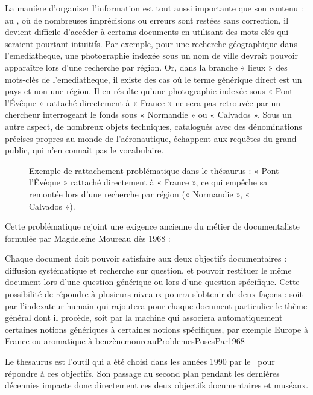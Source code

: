 La manière d’organiser l’information est tout aussi importante que son contenu : au \mae, où de nombreuses imprécisions ou erreurs sont restées sans correction, il devient difficile d’accéder à certains documents en utilisant des mots-clés qui seraient pourtant intuitifs. Par exemple, pour une recherche géographique dans l’\gls{emediatheque}, une photographie indexée sous un nom de ville devrait pouvoir apparaître lors d’une recherche par région. Or, dans la branche « lieux » des mots-clés de l’\gls{emediatheque}, il existe des cas où le terme générique direct est un pays et non une région. Il en résulte qu’une photographie indexée sous « Pont-l’Évêque » rattaché directement à « France » ne sera pas retrouvée par un chercheur interrogeant le fonds sous « Normandie » ou « Calvados ». Sous un autre aspect, de nombreux objets techniques, catalogués avec des dénominations précises propres au monde de l’aéronautique, échappent aux requêtes du grand public, qui n’en connaît pas le vocabulaire.

\begin{figure}[htbp]
	
	\caption{Exemple de rattachement problématique dans le thésaurus : « Pont-l’Évêque » rattaché directement à « France », ce qui empêche sa remontée lors d'une recherche par région (« Normandie », « Calvados »).}
	\label{fig:thesaurus_geo_pb}
\end{figure}


Cette problématique rejoint une exigence ancienne du métier de documentaliste formulée par Magdeleine Moureau dès 1968 :

\begin{myquote}
	{Chaque document doit pouvoir satisfaire aux deux objectifs documentaires : diffusion systématique et recherche sur question, et pouvoir restituer le même document lors d’une question générique ou lors d’une question spécifique. Cette possibilité de répondre à plusieurs niveaux pourra s’obtenir de deux façons : soit par l’indexateur humain qui rajoutera pour chaque document particulier le thème général dont il procède, soit par la machine qui associera automatiquement certaines notions génériques à certaines notions spécifiques, par exemple Europe à France ou aromatique à benzène}{moureauProblemesPosesPar1968}
\end{myquote}

Le \gls{thesaurus} est l’outil qui a été choisi dans les années 1990 par le \mae~pour répondre à ces objectifs. Son passage au second plan pendant les dernières décennies impacte donc directement ces deux objectifs documentaires et muséaux.

